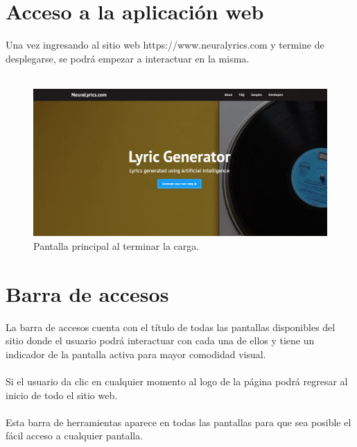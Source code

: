 \documentclass[12pt, a4paper, titlepage]{article}
\begin{document}
	\section{Acceso a la aplicación web}
	Una vez ingresando al sitio web https://www.neuralyrics.com y termine
	de desplegarse, se podrá empezar a interactuar en la misma.\\\\
		\begin{figure}[H]
		\includegraphics[width=13.5cm]{./Imagenes/Capturas/pprincipal.jpg}
		\centering \caption{Pantalla principal al terminar la carga.}
	\end{figure}

	\section{Barra de accesos}
	La barra de accesos cuenta con el título de todas las pantallas disponibles del sitio donde el usuario podrá interactuar con cada una de ellos y tiene un indicador de la pantalla activa para mayor comodidad visual.\\\\
	Si el usuario da clic en cualquier momento al logo de la página podrá regresar al inicio de todo el sitio web.\\\\
	Esta barra de herramientas aparece en todas las pantallas para que sea posible el fácil acceso a cualquier pantalla.
	
\end{document}
